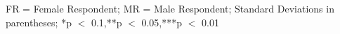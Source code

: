 \begin{table}[hp]
{\begin{tabularx}{\textwidth}{lCCCCCCC}
\end{tabularx}
\begin{flushleft}
\footnotesize FR = Female Respondent; MR = Male Respondent; Standard Deviations in parentheses; *p $<$ 0.1,**p $<$ 0.05,***p $<$ 0.01
\end{flushleft}
}
\end{table}
